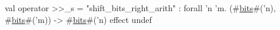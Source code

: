 val operator >>_s = "shift_bits_right_arith" : forall 'n 'm. (#\hyperref[zbits]{bits}#('n), #\hyperref[zbits]{bits}#('m)) -> #\hyperref[zbits]{bits}#('n) effect {undef}
